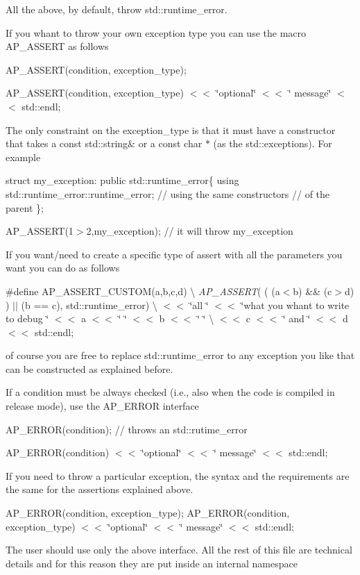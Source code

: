 All the above, by default, throw std\+::runtime\+\_\+error.

If you whant to throw your own exception type you can use the macro A\+P\+\_\+\+A\+S\+S\+E\+RT as follows

A\+P\+\_\+\+A\+S\+S\+E\+R\+T(condition, exception\+\_\+type);

A\+P\+\_\+\+A\+S\+S\+E\+R\+T(condition, exception\+\_\+type) $<$$<$ \char`\"{}optional\char`\"{} $<$$<$ \char`\"{} message\char`\"{} $<$$<$ std\+::endl;

The only constraint on the exception\+\_\+type is that it must have a constructor that takes a const std\+::string\& or a const char $\ast$ (as the std\+::exceptions). For example

struct my\+\_\+exception\+: public std\+::runtime\+\_\+error\{ using std\+::runtime\+\_\+error\+::runtime\+\_\+error; // using the same constructors // of the parent \};

A\+P\+\_\+\+A\+S\+S\+E\+R\+T(1$>$2,my\+\_\+exception); // it will throw my\+\_\+exception

If you want/need to create a specific type of assert with all the parameters you want you can do as follows

\#define A\+P\+\_\+\+A\+S\+S\+E\+R\+T\+\_\+\+C\+U\+S\+T\+O\+M(a,b,c,d) \textbackslash{} {\itshape A\+P\+\_\+\+A\+S\+S\+E\+RT}( ( (a$<$b) \&\& (c$>$d) ) $\vert$$\vert$ (b == c), std\+::runtime\+\_\+error) \textbackslash{} $<$$<$ \char`\"{}all \char`\"{} $<$$<$ \char`\"{}what you whant to write to debug \char`\"{} $<$$<$ a $<$$<$ \char`\"{} \char`\"{} $<$$<$ b $<$$<$ \char`\"{} \char`\"{} \textbackslash{} $<$$<$ c $<$$<$ \char`\"{} and \char`\"{} $<$$<$ d $<$$<$ std\+::endl;

of course you are free to replace std\+::runtime\+\_\+error to any exception you like that can be constructed as explained before.

If a condition must be always checked (i.\+e., also when the code is compiled in release mode), use the A\+P\+\_\+\+E\+R\+R\+OR interface

A\+P\+\_\+\+E\+R\+R\+O\+R(condition); // throws an std\+::rutime\+\_\+error

A\+P\+\_\+\+E\+R\+R\+O\+R(condition) $<$$<$ \char`\"{}optional\char`\"{} $<$$<$ \char`\"{} message\char`\"{} $<$$<$ std\+::endl;

If you need to throw a particular exception, the syntax and the requirements are the same for the assertions explained above.

A\+P\+\_\+\+E\+R\+R\+O\+R(condition, exception\+\_\+type); A\+P\+\_\+\+E\+R\+R\+O\+R(condition, exception\+\_\+type) $<$$<$ \char`\"{}optional\char`\"{} $<$$<$ \char`\"{} message\char`\"{} $<$$<$ std\+::endl;

The user should use only the above interface. All the rest of this file are technical details and for this reason they are put inside an internal namespace 
